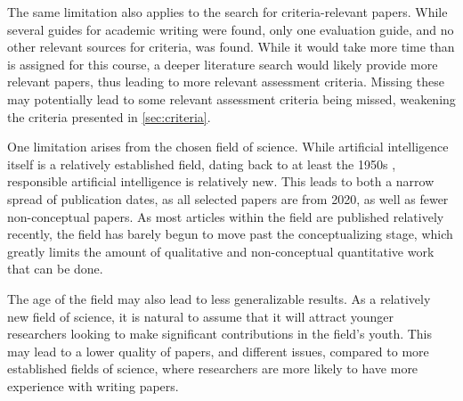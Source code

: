 The same limitation also applies to the search for criteria-relevant papers. While several guides for academic writing were found, only one evaluation guide, and no other relevant sources for criteria, was found. While it would take more time than is assigned for this course, a deeper literature search would likely provide more relevant papers, thus leading to more relevant assessment criteria. Missing these may potentially lead to some relevant assessment criteria being missed, weakening the criteria presented in \autoref{sec:criteria}.

One limitation arises from the chosen field of science. While artificial intelligence itself is a relatively established field, dating back to at least the 1950s \parencite{Moor_2006}, responsible artificial intelligence is relatively new. This leads to both a narrow spread of publication dates, as all selected papers are from 2020, as well as fewer non-conceptual papers. As most articles within the field are published relatively recently, the field has barely begun to move past the conceptualizing stage, which greatly limits the amount of qualitative and non-conceptual quantitative work that can be done.

The age of the field may also lead to less generalizable results. As a relatively new field of science, it is natural to assume that it will attract younger researchers looking to make significant contributions in the field's youth. This may lead to a lower quality of papers, and different issues, compared to more established fields of science, where researchers are more likely to have more experience with writing papers.